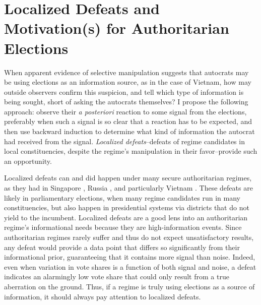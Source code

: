 \documentclass[12pt]{article}
\newcommand{\1}{\mathbbm{1}}
\begin{document}
\section*{Localized Defeats and Motivation(s) for Authoritarian Elections}
\label{sec:theory_local_defeat}

When apparent evidence of selective manipulation suggests that autocrats may be using elections as an information source, as in the case of Vietnam, how may outside observers confirm this suspicion, and tell which type of information is being sought, short of asking the autocrats themselves? I propose the following approach: observe their \textit{a posteriori} reaction to some signal from the elections, preferably when such a signal is so clear that a reaction has to be expected, and then use backward induction to determine what kind of information the autocrat had received from the signal. \textit{Localized defeats}--defeats of regime candidates in local constituencies, despite the regime's manipulation in their favor--provide such an opportunity. 


Localized defeats can and did happen under many secure authoritarian regimes, as they had in Singapore \citep{Ortmann2011}, Russia \citep{Gelman2013}, and particularly Vietnam \citep{MaleskySchuler2011}. These defeats are likely in parliamentary elections, when many regime candidates run in many constituencies, but also happen in presidential systems via districts that do not yield to the incumbent. Localized defeats are a good lens into an authoritarian regime's informational needs because they are high-information events. Since authoritarian regimes rarely suffer and thus do not expect unsatisfactory results, any defeat would provide a data point that differs so significantly from their informational prior, guaranteeing that it contains more signal than noise. Indeed, even when variation in vote shares is a function of both signal and noise, a defeat indicates an alarmingly low vote share that could only result from a true aberration on the ground. Thus, if a regime is truly using elections as a source of information, it should always pay attention to localized defeats. 
\end{document}
